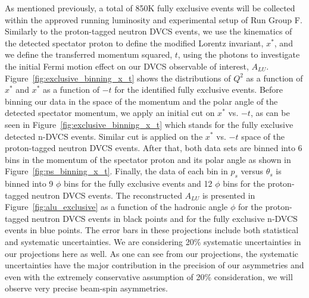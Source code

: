 As mentioned previously, a total of 850K fully exclusive events will be 
collected within the approved running luminosity and experimental setup of Run 
Group F. Similarly to the proton-tagged neutron DVCS events, we use the 
kinematics of the detected spectator proton to define the modified Lorentz 
invariant, $x^*$, and we define the transferred momentum squared, $t$, using 
the photons to investigate the initial Fermi motion effect on our DVCS 
observable of interest, $A_{LU}$. Figure~\ref{fig:exclusive_binning_x_t} shows 
the distributions of  $Q^2$ as a function of  $x^*$ and  $x^{*}$ as a function 
of $-t$ for the identified fully exclusive events. Before binning our data in 
the space of the momentum and the polar angle of the detected spectator 
momentum, we apply an initial cut on $x^{*}$ vs. $-t$, as can be seen in 
Figure~\ref{fig:exclusive_binning_x_t} which stands for the fully exclusive 
detected n-DVCS events. Similar cut is applied on the $x^{*}$ vs. $-t$ space of 
the proton-tagged neutron DVCS events. After that, both data sets are binned 
into 6 bins in the momentum of the spectator proton and its polar angle as 
shown in Figure~\ref{fig:ps_binning_x_t}. Finally, the data of each bin in 
$p_s$ versus
$\theta_s$ is binned into 9 $\phi$ bins for the fully exclusive events and 12 
$\phi$ bins for the proton-tagged neutron DVCS events. The reconstructed 
$A_{LU}$ is presented in Figure~\ref{fig:alu_exclusive} as a function of the 
hadronic angle $\phi$ for the proton-tagged neutron DVCS events in black points 
and for the fully exclusive n-DVCS events in blue points. The error bars in 
these projections include both statistical and systematic uncertainties. We are 
considering 20\% systematic uncertainties in our projections here as well. As 
one can see from our projections, the systematic uncertainties have the major 
contribution in the precision of our asymmetries and even with the extremely 
conservative assumption of 20\% consideration, we will observe very precise 
beam-spin asymmetries.        

